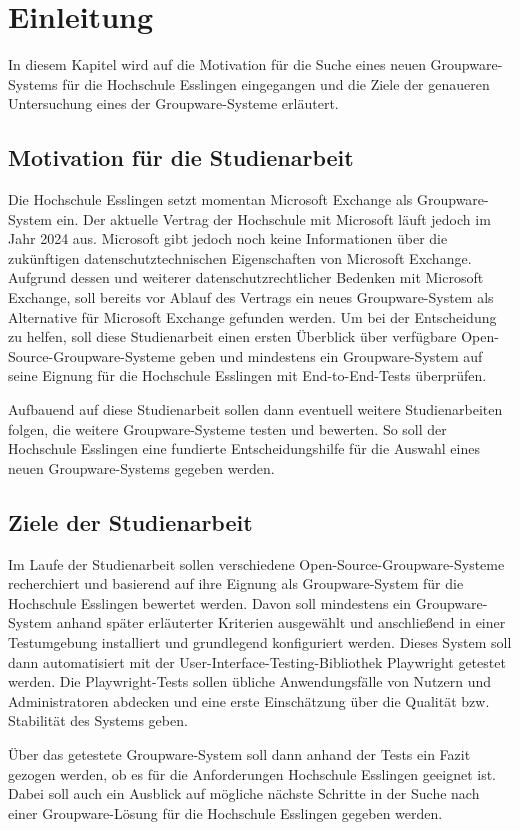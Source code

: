 
\chapter{Einleitung}

In diesem Kapitel wird auf die Motivation für die Suche eines neuen Groupware-Systems für die Hochschule Esslingen eingegangen und die Ziele der genaueren Untersuchung eines der Groupware-Systeme erläutert.


\section{Motivation für die Studienarbeit}

Die Hochschule Esslingen setzt momentan Microsoft Exchange als Groupware-System ein.
Der aktuelle Vertrag der Hochschule mit Microsoft läuft jedoch im Jahr 2024 aus.
Microsoft gibt jedoch noch keine Informationen über die zukünftigen datenschutztechnischen Eigenschaften von Microsoft Exchange.
Aufgrund dessen und weiterer datenschutzrechtlicher Bedenken mit Microsoft Exchange, soll bereits vor Ablauf des Vertrags ein neues Groupware-System als Alternative für Microsoft Exchange gefunden werden.
Um bei der Entscheidung zu helfen, soll diese Studienarbeit einen ersten Überblick über verfügbare Open-Source-Groupware-Systeme geben und mindestens ein Groupware-System auf seine Eignung für die Hochschule Esslingen mit End-to-End-Tests überprüfen.

Aufbauend auf diese Studienarbeit sollen dann eventuell weitere Studienarbeiten folgen, die weitere Groupware-Systeme testen und bewerten.
So soll der Hochschule Esslingen eine fundierte Entscheidungshilfe für die Auswahl eines neuen Groupware-Systems gegeben werden.


\section{Ziele der Studienarbeit}

Im Laufe der Studienarbeit sollen verschiedene Open-Source-Groupware-Systeme recherchiert und basierend auf ihre Eignung als Groupware-System für die Hochschule Esslingen bewertet werden.
Davon soll mindestens ein Groupware-System anhand später erläuterter Kriterien ausgewählt und anschließend in einer Testumgebung installiert und grundlegend konfiguriert werden.
Dieses System soll dann automatisiert mit der User-Interface-Testing-Bibliothek Playwright getestet werden.
Die Playwright-Tests sollen übliche Anwendungsfälle von Nutzern und Administratoren abdecken und eine erste Einschätzung über die Qualität bzw. Stabilität des Systems geben.

Über das getestete Groupware-System soll dann anhand der Tests ein Fazit gezogen werden, ob es für die Anforderungen Hochschule Esslingen geeignet ist.
Dabei soll auch ein Ausblick auf mögliche nächste Schritte in der Suche nach einer Groupware-Lösung für die Hochschule Esslingen gegeben werden.


